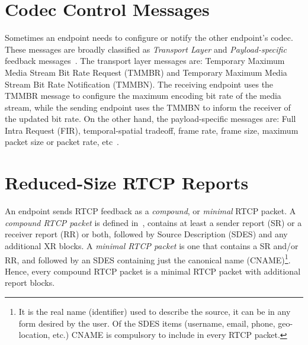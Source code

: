 

\section{Codec Control Messages}

Sometimes an endpoint needs to configure or notify the other endpoint's codec.
These messages are broadly classified as \emph{Transport Layer} and \emph
{Payload-specific} feedback messages~\cite{rfc5104}. The transport layer
messages are: Temporary Maximum Media Stream Bit Rate Request (TMMBR) and
Temporary Maximum Media Stream Bit Rate Notification (TMMBN). The receiving
endpoint uses the TMMBR message to configure the maximum encoding bit rate of
the media stream, while the sending endpoint uses the TMMBN to inform the
receiver of the updated bit rate. On the other hand, the payload-specific
messages are: Full Intra Request (FIR), temporal-spatial tradeoff, frame
rate, frame size, maximum packet size or packet rate,
etc~\cite{draft.avt.cop}.

\section{Reduced-Size RTCP Reports}

An endpoint sends RTCP feedback as a \emph{compound}, or \emph{minimal} RTCP
packet. A \emph{compound RTCP packet} is defined in~\cite{rfc3585}, contains
at least a sender report (SR) or a receiver report (RR) or both, followed by
Source Description (SDES) and any additional XR blocks. A \emph{minimal RTCP
packet} is one that contains a SR and/or RR, and followed by an SDES
containing just the canonical name (CNAME)\footnote{It is the real name
(identifier) used to describe the source, it can be in any form desired by the
user. Of the SDES items (username, email, phone, geo-location, etc.) CNAME is
compulsory to include in every RTCP packet.}. Hence, every compound RTCP
packet is a minimal RTCP packet with additional report blocks.

